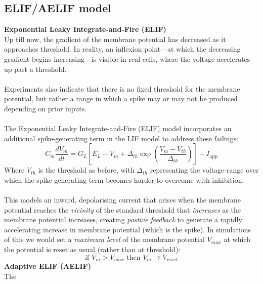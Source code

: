 \documentclass{report}
\begin{document}
\subsection{ELIF/AELIF model}
\textbf{Exponential Leaky Integrate-and-Fire (ELIF)}\\
Up till now, the gradient of the membrane potential has decreased as it approaches threshold. In reality,
an inflexion point---at which the decreasing gradient begins increasing---is visible in real cells, where
the voltage accelerates up past a threshold.\\
\vspace{1mm}\\
Experiments also indicate that there is no fixed threshold for the membrane potential, but rather a range in which
a spike may or may not be produced depending on prior inputs.\\
\vspace{1mm}\\
The Exponential Leaky Integrate-and-Fire (ELIF) model incorporates an additional spike-generating term in the 
LIF model to address these failings:
\begin{equation*}
C_m\frac{dV_m}{dt}=G_L\left[E_L-V_m+\Delta_{th}\exp\left(\frac{V_m-V_{th}}{\Delta_{th}}\right)\right]+I_{\text{app}}
\end{equation*}
Where $V_{th}$ is the threshold as before, with $\Delta_{th}$ representing the voltage-range over which the
spike-generating term becomes harder to overcome with inhibition.\\
\vspace{1mm}\\
This models an inward, depolarising current that arises when the membrane potential reaches the \textit{vicinity} 
of the standard threshold that \textit{increases} as the membrane potential increases, creating 
\textit{postive feedback} to generate a rapidly accelerating increase in membrane potential (which is the spike).
In simulations of this we would set a \textit{maximum level} of the membrane potential $V_{max}$ at which the
potential is reset as usual (rather than at threshold):
\begin{equation*}
\text{if }V_m>V_{max}\text{ then }V_m\mapsto V_{reset}
\end{equation*}
\newpage
\noindent\textbf{Adaptive ELIF (AELIF)}\\
The
\end{document}
